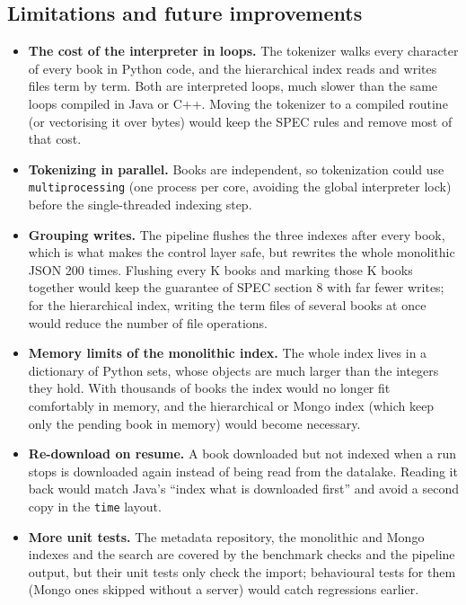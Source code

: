 \documentclass[11pt,a4paper]{article}
\newcommand{\code}[1]{\texttt{#1}}
\begin{document}
\subsection{Limitations and future improvements}
\begin{itemize}
  \item \textbf{The cost of the interpreter in loops.} The tokenizer walks every character of every
        book in Python code, and the hierarchical index reads and writes files term by term. Both
        are interpreted loops, much slower than the same loops compiled in Java or C++. Moving the
        tokenizer to a compiled routine (or vectorising it over bytes) would keep the SPEC rules and
        remove most of that cost.
  \item \textbf{Tokenizing in parallel.} Books are independent, so tokenization could use
        \code{multiprocessing} (one process per core, avoiding the global interpreter lock) before
        the single-threaded indexing step.
  \item \textbf{Grouping writes.} The pipeline flushes the three indexes after every book, which is
        what makes the control layer safe, but rewrites the whole monolithic JSON 200 times.
        Flushing every K books and marking those K books together would keep the guarantee of SPEC
        section 8 with far fewer writes; for the hierarchical index, writing the term files of
        several books at once would reduce the number of file operations.
  \item \textbf{Memory limits of the monolithic index.} The whole index lives in a dictionary of
        Python sets, whose objects are much larger than the integers they hold. With thousands of
        books the index would no longer fit comfortably in memory, and the hierarchical or Mongo
        index (which keep only the pending book in memory) would become necessary.
  \item \textbf{Re-download on resume.} A book downloaded but not indexed when a run stops is
        downloaded again instead of being read from the datalake. Reading it back would match
        Java's ``index what is downloaded first'' and avoid a second copy in the \code{time} layout.
  \item \textbf{More unit tests.} The metadata repository, the monolithic and Mongo indexes and the
        search are covered by the benchmark checks and the pipeline output, but their unit tests
        only check the import; behavioural tests for them (Mongo ones skipped without a server)
        would catch regressions earlier.
\end{itemize}
\end{document}
